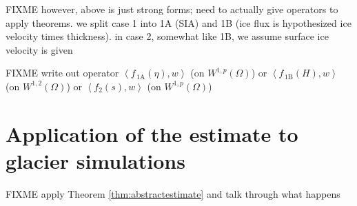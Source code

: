 \documentclass[hidelinks,onefignum,onetabnum,final]{siamart220329}  %
\newcommand{\ip}[2]{\left<#1,#2\right>}
\begin{document}
FIXME however, above is just strong forms; need to actually give operators to apply theorems.  we split case 1 into 1A (SIA) and 1B (ice flux is hypothesized ice velocity times thickness).  in case 2, somewhat like 1B, we assume surface ice velocity is given

\newcommand{\foneA}{f_{\,\text{1A}}}
\newcommand{\foneB}{f_{\,\text{1B}}}

FIXME write out operator $\ip{\foneA(\eta)}{w}$ (on $W^{1,p}(\Omega)$) or $\ip{\foneB(H)}{w}$ (on $W^{1,2}(\Omega)$) or $\ip{f_2(s)}{w}$  (on $W^{1,p}(\Omega)$)


\section{Application of the estimate to glacier simulations} \label{sec:application}

FIXME apply Theorem \ref{thm:abstractestimate} and talk through what happens




\end{document}
